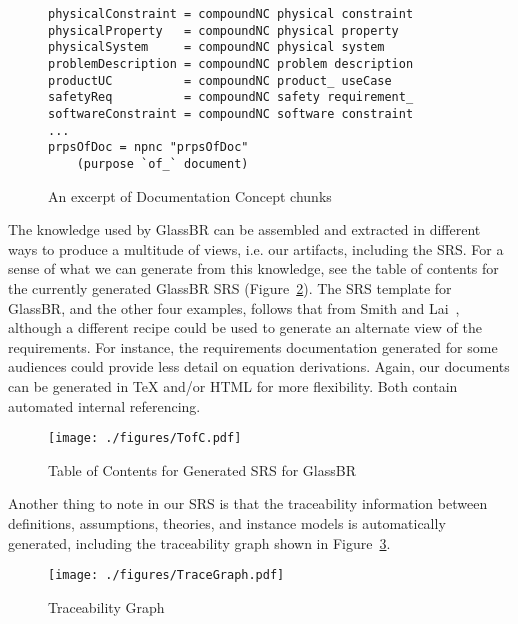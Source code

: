 \documentclass[sigconf]{acmart}
\begin{document}
{\begin{figure}%
\begin{lstlisting}[frame=single, showstringspaces=false, basicstyle=\small, upquote=false]
physicalConstraint = compoundNC physical constraint
physicalProperty   = compoundNC physical property
physicalSystem     = compoundNC physical system
problemDescription = compoundNC problem description
productUC          = compoundNC product_ useCase
safetyReq          = compoundNC safety requirement_
softwareConstraint = compoundNC software constraint
...
prpsOfDoc = npnc "prpsOfDoc" 
    (purpose `of_` document)

\end{lstlisting}
\caption{An excerpt of Documentation Concept chunks}
\label{Fig_docConcepts}
\end{figure}

The knowledge used by GlassBR can be assembled and extracted in different ways
to produce a multitude of views, i.e. our artifacts, including the SRS. For a
sense of what we can generate from this knowledge, see the table of contents for
the currently generated GlassBR SRS (Figure~\ref{Fig_ToCGlassBRSRS}). The SRS
template for GlassBR, and the other four examples, follows that from Smith and
Lai~\cite{SmithAndLai2005}, although a different recipe could be used to
generate an alternate view of the requirements.  For instance, the requirements
documentation generated for some audiences could provide less detail on equation
derivations.  Again, our documents can be generated in TeX and/or HTML for more
flexibility. Both contain automated internal referencing.

\begin{figure}
\begin{center}
\texttt{[image: ./figures/TofC.pdf]}
\end{center}
\caption{Table of Contents for Generated SRS for GlassBR}
\label{Fig_ToCGlassBRSRS}
\end{figure}

Another thing to note in our SRS is that the traceability information between
definitions, assumptions, theories, and instance models is automatically 
generated, including the traceability graph shown in 
Figure~\ref{Fig_TraceGraph}.

\begin{figure}
\begin{center}
\texttt{[image: ./figures/TraceGraph.pdf]}
\end{center}
\caption{Traceability Graph}
\label{Fig_TraceGraph}
\end{figure}

}
\end{document}
